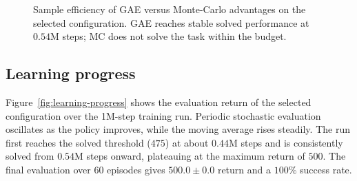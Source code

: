 \documentclass{article}
\begin{document}
\begin{figure}[H]
  \caption{Sample efficiency of GAE versus Monte-Carlo advantages on the selected configuration. GAE reaches stable solved performance at $0.54$M steps; MC does not solve the task within the budget.}
  \label{fig:sample-efficiency}
\end{figure}

\subsection{Learning progress}

Figure~\ref{fig:learning-progress} shows the evaluation return of the selected configuration over the 1M-step training run. Periodic stochastic evaluation oscillates as the policy improves, while the moving average rises steadily. The run first reaches the solved threshold ($475$) at about $0.44$M steps and is consistently solved from $0.54$M steps onward, plateauing at the maximum return of $500$. The final evaluation over 60 episodes gives $500.0 \pm 0.0$ return and a $100\%$ success rate.
\end{document}
